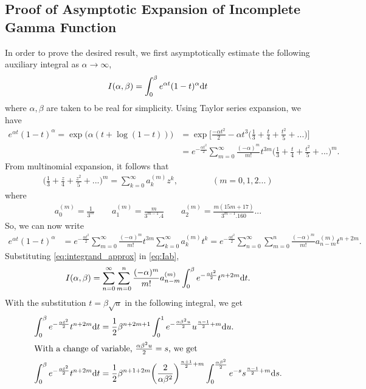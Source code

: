 \documentclass[journal,draftclsnofoot,onecolumn,12pt]{IEEEtran}
\begin{document}
\subsection{Proof of Asymptotic Expansion of Incomplete Gamma Function}\label{app:igf}
In order to prove the desired result, we first asymptotically estimate the following auxiliary integral as $\alpha \to \infty$,
\begin{align}\label{eq:Iab}
I(\alpha, \beta) = \int_0^\beta e^{\alpha t }(1-t)^\alpha {\rm d}t
\end{align}
where $\alpha, \beta$ are taken to be real for simplicity.
Using Taylor series expansion, we have
\begin{align*}
e^{\alpha t }(1-t)^\alpha = \exp\bigg( \alpha(t + \log(1-t)) \bigg) &= \exp \Bigg[ \frac{-\alpha t^2}{2} -\alpha t^3\bigg(\frac{1}{3} + \frac{t}{4} + \frac{t^2}{5} + ...\bigg) \Bigg] \\
&= e^{-\frac{\alpha t^2}{2}} \sum_{m=0}^{\infty} \frac{(-\alpha)^m}{m!}  t^{3m} \bigg(\frac{1}{3} + \frac{t}{4} + \frac{t^2}{5} + ...\bigg)^m .
\end{align*}
From multinomial expansion, it follows that
\begin{align*}
\bigg(\frac{1}{3} + \frac{z}{4} + \frac{z^2}{5} + ...\bigg)^m = \sum_{k=0}^{\infty} a_k^{(m)} z^k,   \qquad \qquad  (m = 0,1,2...)
\end{align*}
where
\begin{align*}
a_0^{(m)} = \frac{1}{3^m} \qquad a_1^{(m)} = \frac{m}{3^{m-1}.4} \qquad a_2^{(m)} = \frac{m(15m+17)}{3^{m-1}.160} ...
\end{align*}
So, we can now write
\begin{align} \label{eq:integrand_approx}
e^{\alpha t }(1-t)^\alpha &= e^{-\frac{\alpha t^2}{2}} \sum_{m=0}^{\infty} \frac{(-\alpha)^m}{m!}  t^{3m} \sum_{k=0}^{\infty} a_k^{(m)}t^k = e^{-\frac{\alpha t^2}{2}} \sum_{n=0}^{\infty} \sum_{m=0}^n  \frac{(-\alpha)^m}{m!}a_{n-m}^{(m)} t^{n+2m}.
\end{align}
Substituting \eqref{eq:integrand_approx} in \eqref{eq:Iab},
\begin{align}\label{eq:Iab2}
I(\alpha, \beta) =  \sum_{n=0}^{\infty} \sum_{m=0}^n  \frac{(-\alpha)^m}{m!}a_{n-m}^{(m)} \int_0^{\beta} e^{-\frac{\alpha t^2}{2}} t^{n+2m} {\rm d}t.
\end{align}
With the substitution $t=\beta \sqrt{u}$ in the following integral, we get
\begin{align}\notag
\int_0^{\beta} e^{-\frac{\alpha t^2}{2}}t^{n+2m} {\rm d}t &= \frac{1}{2} \beta^{n+2m+1} \int_0^1 e^{-\frac{\alpha \beta^2 u}{2}} u^{\frac{n-1}{2} + m } {\rm d}u. \\
\intertext{With a change of variable, $\frac{\alpha \beta^2 u}{2} = s$, we get} \label{eq:int_step1}
\int_0^{\beta} e^{-\frac{\alpha t^2}{2}}t^{n+2m} {\rm d}t &=\frac{1}{2} \beta^{n+1+2m}  \bigg(\frac{2}{\alpha \beta^2}\bigg)^{\frac{n+1}{2}+m} \int_0^{\frac{\alpha \beta^2}{2}} e^{-s} s^{\frac{n-1}{2}+m} {\rm d}s .
\end{align}
\end{document}
